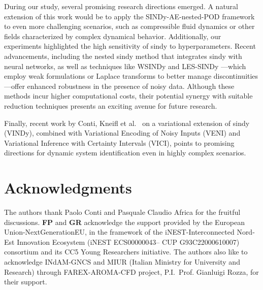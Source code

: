 \documentclass[reqno]{amsart}[standalone]
\theoremstyle{definition}
\theoremstyle{remark}
\begin{document}
During our study, several promising research directions emerged. A natural extension of this work would be to apply the SINDy-AE-nested-POD framework to even more challenging scenarios, such as compressible fluid dynamics or other fields characterized by complex dynamical behavior. Additionally, our experiments highlighted the high sensitivity of \gls{sindy} to hyperparameters. Recent advancements, including the nested \gls{sindy} method \parencite{nested_SINDy} that integrates \gls{sindy} with neural networks, as well as techniques like WSINDy \parencite{Messenger_2021} and LES-SINDy \parencite{Zheng2024LESSINDyLS}—which employ weak formulations or Laplace transforms to better manage discontinuities—offer enhanced robustness in the presence of noisy data. Although these methods incur higher computational costs, their potential synergy with suitable reduction techniques presents an exciting avenue for future research.

Finally, recent work by Conti, Kneifl et al.\ \parencite{VVV, VVV_code} on a variational extension of \gls{sindy} (VINDy), combined with Variational Encoding of Noisy Inputs (VENI) and Variational Inference with Certainty Intervals (VICI), points to promising directions for dynamic system identification even in highly complex scenarios.

\section{Acknowledgments}
The authors thank Paolo Conti and Pasquale Claudio Africa for the fruitful discussions.
\textbf{FP} and \textbf{GR} acknowledge the support provided by the European Union-NextGenerationEU, in the framework of the iNEST-Interconnected Nord-Est Innovation Ecosystem (iNEST ECS00000043– CUP G93C22000610007) consortium and its CC5 Young Researchers initiative. The authors also like to acknowledge INdAM-GNCS and MIUR (Italian Ministry for University and Research) through FAREX-AROMA-CFD project, P.I.\ Prof. Gianluigi Rozza, for their support.

%
\renewcommand{\bibfont}{\small}
\printbibliography[]
\end{document}

